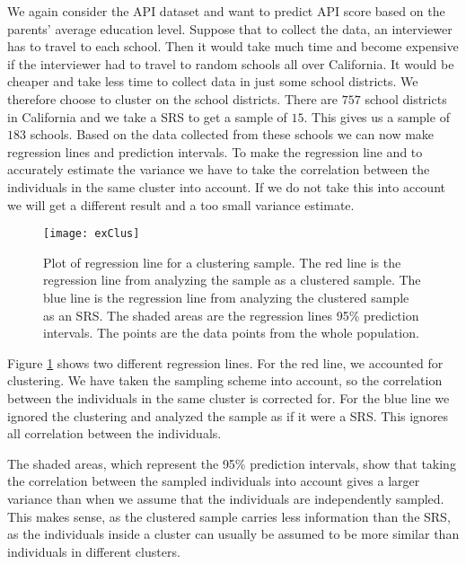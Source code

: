 \documentclass{article}
\begin{document}
\begin{example}
  We again consider the API dataset and want to predict API score based on
  the parents' average education level. Suppose that to collect the data, an
  interviewer has to travel to each school. Then it would take much time and
  become expensive if the interviewer had to travel to random schools all over
  California. It would be cheaper and take less time to
  collect data in just some school districts. We therefore choose to cluster
  on the school districts. There are \(757\) school districts in California and we take a SRS to
  get a sample of \(15\). This gives us a sample of \(183\) schools. Based on
  the data collected from these schools we can now make regression lines and
  prediction intervals.
  To make the regression line and to accurately estimate the variance we have to
  take the correlation between the individuals in the same cluster into account.
  If we do not take this into account we will get a different result and a too
  small variance estimate.

  \begin{figure}
    \centering
    \texttt{[image: exClus]}

    \caption{Plot of regression line for a clustering sample. The red line is
      the regression line from analyzing the sample as a clustered sample. The
      blue line is the regression line from analyzing the clustered sample as an
    SRS. The shaded areas are the regression lines 95\% prediction intervals.
    The points are the data points from the whole population.}

    \label{fig:exClus}
  \end{figure}

  Figure \ref{fig:exClus} shows two different regression lines. For the red
  line, we accounted for clustering. We have taken
  the sampling scheme into account, so the correlation between the individuals
  in the same cluster is corrected for. For the blue line we ignored the
  clustering and analyzed the sample as if it were a SRS. This ignores all
  correlation between the individuals.

  The shaded areas, which represent the 95\% prediction intervals, show that
  taking the correlation between the sampled individuals into account gives a
  larger variance than when we assume that the individuals are independently sampled.
  This makes sense, as the clustered sample carries less information than the
  SRS, as the individuals inside a cluster can usually be assumed to be more
  similar than individuals in different clusters.


\end{example}
\end{document}
